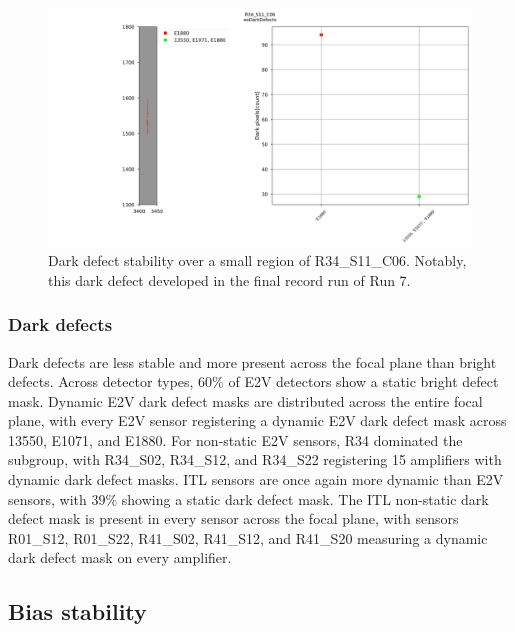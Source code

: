 
\begin{figure}[ht]
    \centering
    \includegraphics[width=\linewidth]{figures/R34_S11_C06(2).jpg}
    \caption{Dark defect stability over a small region of R34\_S11\_C06. Notably, this dark defect developed in the final record run of Run 7.}
    \label{fig:DarkDefectStability}
\end{figure}

\subsubsection{Dark defects}

Dark defects are less stable and more present across the focal plane than bright defects. Across detector types, 60\% of E2V detectors show a static bright defect mask. Dynamic E2V dark defect masks are distributed across the entire focal plane, with every E2V sensor registering a dynamic E2V dark defect mask across 13550, E1071, and E1880. For non-static E2V sensors, R34 dominated the subgroup, with R34\_S02, R34\_S12, and R34\_S22 registering 15 amplifiers with dynamic dark defect masks. ITL sensors are once again more dynamic than E2V sensors, with 39\% showing a static dark defect mask. The ITL non-static dark defect mask is present in every sensor across the focal plane, with sensors R01\_S12, R01\_S22, R41\_S02, R41\_S12, and R41\_S20 measuring a dynamic dark defect mask on every amplifier.



\subsection{Bias stability}\label{sec:bias-stability-2}

